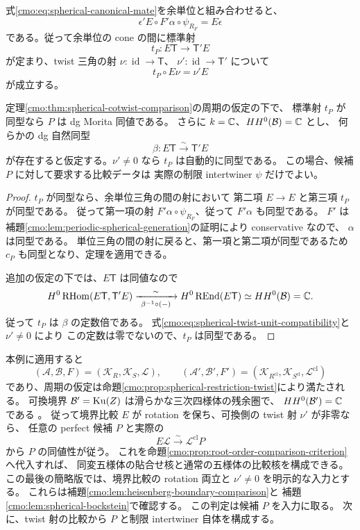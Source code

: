 式\eqref{cmo:eq:spherical-canonical-mate}を余単位と組み合わせると、
\[
 \epsilon' E\circ F'\alpha\circ\psi_{R_F}=E\epsilon
\]
である。従って余単位の cone の間に標準射
\begin{equation}
\label{cmo:eq:spherical-canonical-twist-map}
 t_P:E\mathsf T\longrightarrow\mathsf T'E
\end{equation}
が定まり、twist 三角の射 $\nu:\operatorname{id}\to\mathsf T$、
$\nu':\operatorname{id}\to\mathsf T'$ について
\begin{equation}
\label{cmo:eq:spherical-twist-unit-compatibility}
 t_P\circ E\nu=\nu'E
\end{equation}
が成立する。

\begin{corollary}
\label{cmo:cor:spherical-twist-comparison}
定理\ref{cmo:thm:spherical-cotwist-comparison}の周期の仮定の下で、
標準射 $t_P$ が同型なら $P$ は dg Morita 同値である。
さらに $k=\mathbb C$、$HH^0(\mathcal B)=\mathbb C$ とし、
何らかの dg 自然同型
\[
 \beta:E\mathsf T\xrightarrow{\sim}\mathsf T'E
\]
が存在すると仮定する。$\nu'\ne0$ なら $t_P$ は自動的に同型である。
この場合、候補 $P$ に対して要求する比較データは
実際の制限 intertwiner $\psi$ だけでよい。
\end{corollary}

\begin{proof}
$t_P$ が同型なら、余単位三角の間の射において
第二項 $E\to E$ と第三項 $t_P$ が同型である。
従って第一項の射 $F'\alpha\circ\psi_{R_F}$、従って $F'\alpha$ も同型である。
$F'$ は補題\ref{cmo:lem:periodic-spherical-generation}の証明により conservative なので、
$\alpha$ は同型である。
単位三角の間の射に戻ると、第一項と第二項が同型であるため
$c_P$ も同型となり、定理を適用できる。

追加の仮定の下では、$E\mathsf T$ は同値なので
\[
 H^0\operatorname{RHom}(E\mathsf T,\mathsf T'E)
 \xrightarrow[\ \beta^{-1}\circ(-)\ ]{\ \sim\ }
 H^0\operatorname{REnd}(E\mathsf T)
 \simeq HH^0(\mathcal B)=\mathbb C.
\]
従って $t_P$ は $\beta$ の定数倍である。
式\eqref{cmo:eq:spherical-twist-unit-compatibility}と $\nu'\ne0$ により
この定数は零でないので、$t_P$ は同型である。
\end{proof}

本例に適用すると
\[
 (\mathcal A,\mathcal B,F)=(\mathcal K_R,\mathcal K_S,\mathcal L),
 \qquad
 (\mathcal A',\mathcal B',F')=
 (\mathcal K_{R^{\mathrm{cl}}},\mathcal K_{S^{\mathrm{cl}}},\mathcal L^{\mathrm{cl}})
\]
であり、周期の仮定は命題\ref{cmo:prop:spherical-restriction-twist}により満たされる。
可換境界 $\mathcal B'=\operatorname{Ku}(Z)$ は滑らかな三次四様体の残余圏で、
$HH^0(\mathcal B')=\mathbb C$ である
。
従って境界比較 $E$ が rotation を保ち、可換側の twist 射 $\nu'$ が非零なら、
任意の perfect 候補 $P$ と実際の
\[
 E\mathcal L\xrightarrow{\sim}\mathcal L^{\mathrm{cl}}P
\]
から $P$ の同値性が従う。
これを命題\ref{cmo:prop:root-order-comparison-criterion}へ代入すれば、
同変五様体の貼合せ核と通常の五様体の比較核を構成できる。
この最後の簡略版では、境界比較の rotation 両立と $\nu'\ne0$ を明示的な入力とする。
これらは補題\ref{cmo:lem:heisenberg-boundary-comparison}と
補題\ref{cmo:lem:spherical-bockstein}で確認する。
この判定は候補 $P$ を入力に取る。
次に、twist 射の比較から $P$ と制限 intertwiner 自体を構成する。

